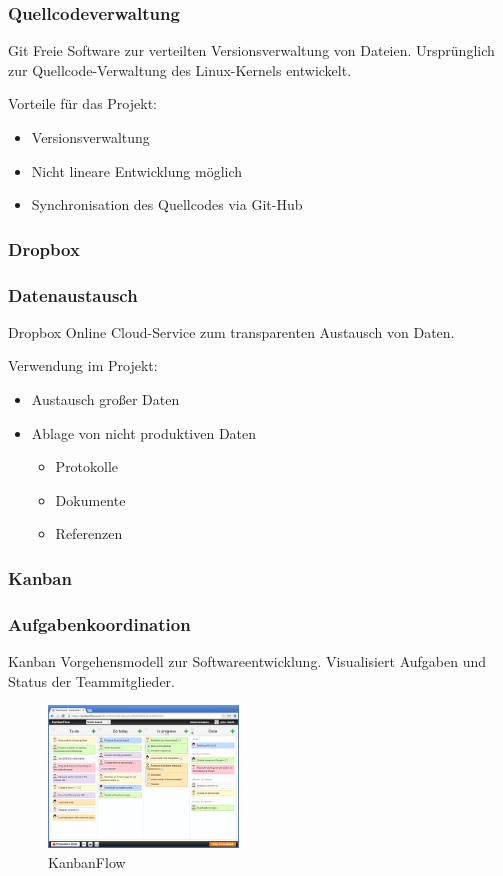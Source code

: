\begin{frame} 
  \frametitle{Quellcodeverwaltung}
  \begin{block}{Git}
   Freie Software zur verteilten Versionsverwaltung von Dateien. 
   Ursprünglich zur Quellcode-Verwaltung des Linux-Kernels entwickelt.
  \end{block}
  Vorteile für das Projekt:
    \begin{itemize}
      \item Versionsverwaltung
      \item Nicht lineare Entwicklung möglich
      \item Synchronisation des Quellcodes via Git-Hub
    \end{itemize}
\end{frame}

\subsubsection{Dropbox}
\begin{frame} 
  \frametitle{Datenaustausch}
  \begin{block}{Dropbox}
    Online Cloud-Service zum transparenten Austausch von Daten.
  \end{block}
  Verwendung im Projekt:
    \begin{itemize}
      \item Austausch großer Daten
      \item Ablage von nicht produktiven Daten
      \begin{itemize}
        \item Protokolle
        \item Dokumente
        \item Referenzen
      \end{itemize}
    \end{itemize}
\end{frame}

\subsubsection{Kanban}

\begin{frame} 
  \frametitle{Aufgabenkoordination}
  \begin{block}{Kanban}
     Vorgehensmodell zur Softwareentwicklung.
     Visualisiert Aufgaben und Status der Teammitglieder.
  \end{block}
    \begin{figure}[htbp]
      \centering
        \includegraphics[width=0.45\textwidth]{./chapters/Kanban.png}
        \caption{KanbanFlow}
        \label{fig:Kanban}
   \end{figure}
\end{frame}


